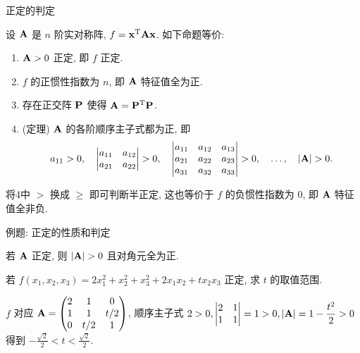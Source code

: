 \begin{frame}{正定的判定}
	\onslide<+->
	\begin{theorem}
		设 ${\mathbf{A}}$ 是 $n$ 阶实对称阵, $f={\mathbf{x}}^{\mathrm{T}}{\mathbf{A}}{\mathbf{x}}$. 如下命题等价:
		\begin{enumerate}
			\item ${\mathbf{A}}>0$ 正定, 即 $f$ 正定.
			\item $f$ 的正惯性指数为 $n$, 即 ${\mathbf{A}}$ 特征值全为正.
			\item 存在正交阵 ${\mathbf{P}}$ 使得 ${\mathbf{A}}={\mathbf{P}}^{\mathrm{T}}{\mathbf{P}}$.
			\item (定理) ${\mathbf{A}}$ 的各阶顺序主子式都为正, 即
			\[a_{11}>0,\quad
			\begin{vmatrix}
				a_{11}&a_{12}\\
				a_{21}&a_{22}
			\end{vmatrix}>0,\quad
			\begin{vmatrix}
				a_{11}&a_{12}&a_{13}\\
				a_{21}&a_{22}&a_{23}\\
				a_{31}&a_{32}&a_{33}
			\end{vmatrix}>0,\quad
			\dots,\quad
			|\bfA|>0.\]
		\end{enumerate}
	\end{theorem}
	\onslide<+->
	将\enumnum4中 $>$ 换成 $\ge$ 即可判断半正定, 这也等价于 $f$ 的负惯性指数为 $0$, 即 ${\mathbf{A}}$ 特征值全非负.
\end{frame}


\begin{frame}{例题: 正定的性质和判定}
	\onslide<+->
	\begin{corollary}
		若 ${\mathbf{A}}$ 正定, 则 $|\bfA|>0$ 且对角元全为正.
	\end{corollary}
	\onslide<+->
	\begin{example}
		若 $f(x_1,x_2,x_3)=2x_1^2+x_2^2+x_3^2+2x_1x_2+tx_2x_3$ 正定, 求 $t$ 的取值范围.
	\end{example}
	\onslide<+->
	\begin{solution}
		$f$ 对应 ${\mathbf{A}}=\begin{pmatrix}
			2&1&0\\
			1&1&t/2\\
			0&t/2&1
		\end{pmatrix}$, 顺序主子式 $2>0,\begin{vmatrix}
			2&1\\1&1
		\end{vmatrix}=1>0,|{\mathbf{A}}|=1-\dfrac{t^2}2>0$
		得到 $\displaystyle-\frac{\sqrt2}2<t<\frac{\sqrt2}2$.
	\end{solution}
\end{frame}


